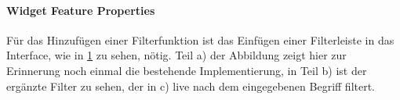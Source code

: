 \newpage
\paragraph{Widget Feature Properties}
Für das Hinzufügen einer Filterfunktion ist das Einfügen einer Filterleiste in das Interface, wie in \cref{fig:FeatureProperty_Adaption} zu sehen, nötig.
Teil a) der Abbildung zeigt hier zur Erinnerung noch einmal die bestehende Implementierung, in Teil b) ist der ergänzte Filter zu sehen, der in c) live nach dem eingegebenen Begriff filtert.

\begin{figure}[H]
  \centering
  \qquad
 \qquad
  \label{fig:FeatureProperty_Adaption}
\end{figure}

